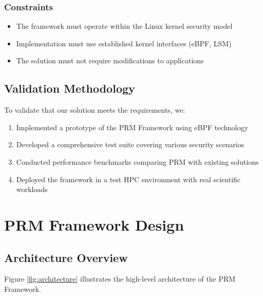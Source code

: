\subsubsection{Constraints}
\begin{itemize}
\item The framework must operate within the Linux kernel security model
\item Implementation must use established kernel interfaces (eBPF, LSM)
\item The solution must not require modifications to applications
\end{itemize}

\subsection{Validation Methodology}
To validate that our solution meets the requirements, we:

\begin{enumerate}
\item Implemented a prototype of the PRM Framework using eBPF technology
\item Developed a comprehensive test suite covering various security scenarios
\item Conducted performance benchmarks comparing PRM with existing solutions
\item Deployed the framework in a test HPC environment with real scientific workloads
\end{enumerate}

\section{PRM Framework Design}
\label{sec:design}

\subsection{Architecture Overview}
Figure \ref{fig:architecture} illustrates the high-level architecture of the PRM Framework.

